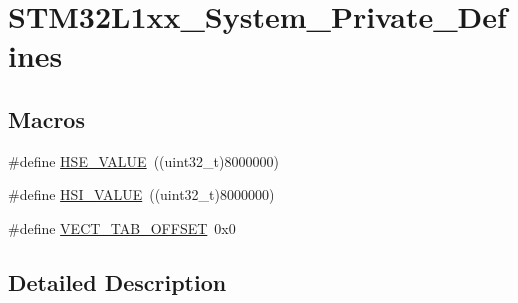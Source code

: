 \hypertarget{group___s_t_m32_l1xx___system___private___defines}{\section{S\-T\-M32\-L1xx\-\_\-\-System\-\_\-\-Private\-\_\-\-Defines}
\label{group___s_t_m32_l1xx___system___private___defines}
}
\subsection*{Macros}
\begin{DoxyCompactItemize}
\item 
\#define \hyperlink{group___s_t_m32_l1xx___system___private___defines_gaeafcff4f57440c60e64812dddd13e7cb}{H\-S\-E\-\_\-\-V\-A\-L\-U\-E}~((uint32\-\_\-t)8000000)
\item 
\#define \hyperlink{group___s_t_m32_l1xx___system___private___defines_gaaa8c76e274d0f6dd2cefb5d0b17fbc37}{H\-S\-I\-\_\-\-V\-A\-L\-U\-E}~((uint32\-\_\-t)8000000)
\item 
\#define \hyperlink{group___s_t_m32_l1xx___system___private___defines_ga40e1495541cbb4acbe3f1819bd87a9fe}{V\-E\-C\-T\-\_\-\-T\-A\-B\-\_\-\-O\-F\-F\-S\-E\-T}~0x0
\end{DoxyCompactItemize}


\subsection{Detailed Description}


